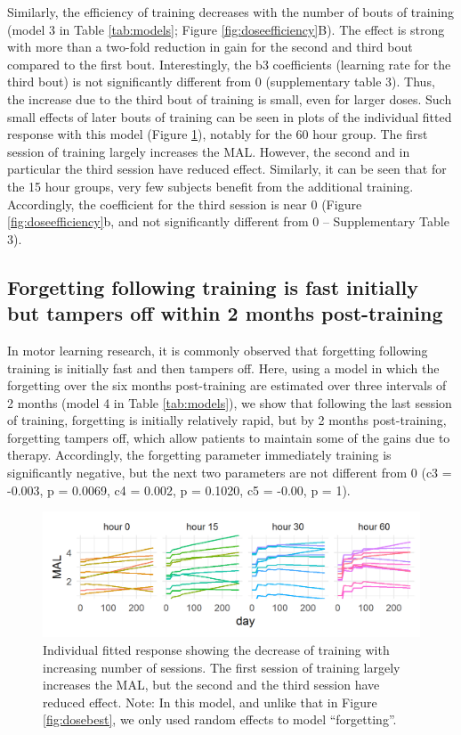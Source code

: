 Similarly, the efficiency of training decreases with the number of bouts of training (model 3 in Table \ref{tab:models}; Figure \ref{fig:doseefficiency}B). 
The effect is strong with more than a two-fold reduction in gain for the second and third bout compared to the first bout. 
Interestingly, the b3 coefficients (learning rate for the third bout) is not significantly different from 0 (supplementary table 3). 
Thus, the increase due to the third bout of training is small, even for larger doses. 
Such small effects of later bouts of training can be seen in plots of the individual fitted response with this model (Figure \ref{fig:indtimingefficiencybc}), notably for the 60 hour group. 
The first session of training largely increases the MAL. 
However, the second and in particular the third session have reduced effect. 
Similarly, it can be seen that for the 15 hour groups, very few subjects benefit from the additional training. 
Accordingly, the coefficient for the third session is near 0 (Figure \ref{fig:doseefficiency}b, and not significantly different from 0 – Supplementary Table 3).

\subsection{Forgetting following training is fast initially but tampers off within 2 months post-training}
In motor learning research, it is commonly observed that forgetting following training is initially fast and then tampers off. 
Here, using a model in which the forgetting over the six months post-training are estimated over three intervals of 2 months (model 4 in Table \ref{tab:models}), we show that following the last session of training, forgetting is initially relatively rapid, but by 2 months post-training, forgetting tampers off, which allow patients to maintain some of the gains due to therapy. 
Accordingly, the forgetting parameter immediately training is significantly negative, but the next two parameters are not different from 0 (c3 = -0.003, p = 0.0069, c4 = 0.002, p = 0.1020, c5 = -0.00, p = 1).

\begin{figure}
	\centering
	\includegraphics[width=\linewidth]{figures/Ind_timing_efficiency_b_c}
	\caption[Individual fitted response showing the decrease of training with increasing number of sessions.]{Individual fitted response showing the decrease of training with increasing number of sessions. The first session of training largely increases the MAL, but the second and the third session have reduced effect. Note: In this model, and unlike that in Figure \ref{fig:dosebest}, we only used random effects to model “forgetting”.}
	\label{fig:indtimingefficiencybc}
\end{figure}


